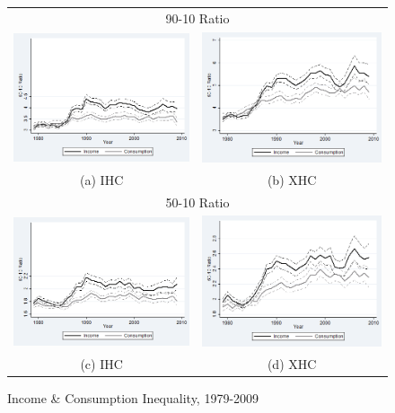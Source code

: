 \begin{figure}[bp!]
\caption{Income \& Consumption Inequality, 1979-2009}
\centering
\begin{tabular}{cc}
\multicolumn{2}{c}{90-10 Ratio} \\
\includegraphics[width=.5\linewidth]{pictures/ihc_1.png} & \includegraphics[width=.5\linewidth]{pictures/xhc_1.png} \\
(a) IHC & (b) XHC \\
\multicolumn{2}{c}{50-10 Ratio} \\
\includegraphics[width=.5\linewidth]{pictures/ihc_2.png} & \includegraphics[width=.5\linewidth]{pictures/xhc_2.png} \\
(c) IHC & (d) XHC \\
\end{tabular}
\label{fig:inequal_trends}
\end{figure}

